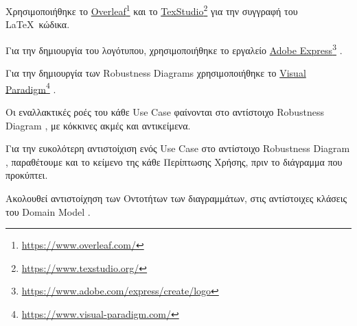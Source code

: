 \documentclass{../ol-softwaremanual}
\newcommand{\doclink}[2]{\href{#1}{#2}\footnote{\url{#1}}}
\begin{document}
	
	\vspace{20pt}
	\flushleft
	Χρησιμοποιήθηκε το \en \doclink{https://www.overleaf.com/}{Overleaf} \gr και το \en \doclink{https://www.texstudio.org/}{TexStudio} \gr για την συγγραφή του \LaTeX\ κώδικα. \break
	
	Για την δημιουργία του λογότυπου, χρησιμοποιήθηκε το εργαλείο \en \doclink{https://www.adobe.com/express/create/logo}{Adobe Express} . \gr \break
	
	Για την δημιουργία των \en Robustness Diagrams \gr χρησιμοποιήθηκε το \en \doclink{https://www.visual-paradigm.com/}{Visual Paradigm} . \gr \break 
	
	\newpage
	
	\flushleft
	
	Οι εναλλακτικές ροές του κάθε \en Use Case \gr φαίνονται στο αντίστοιχο \en Robustness Diagram \gr, με κόκκινες ακμές και αντικείμενα. \break
	
	Για την ευκολότερη αντιστοίχιση ενός \en Use Case \gr στο αντίστοιχο \en Robustness Diagram \gr, παραθέτουμε και το κείμενο της κάθε Περίπτωσης Χρήσης, πριν το διάγραμμα που προκύπτει. \break
	
	Ακολουθεί αντιστοίχηση των Οντοτήτων των διαγραμμάτων, στις αντίστοιχες κλάσεις του \en Domain Model \gr.
	
\end{document}
